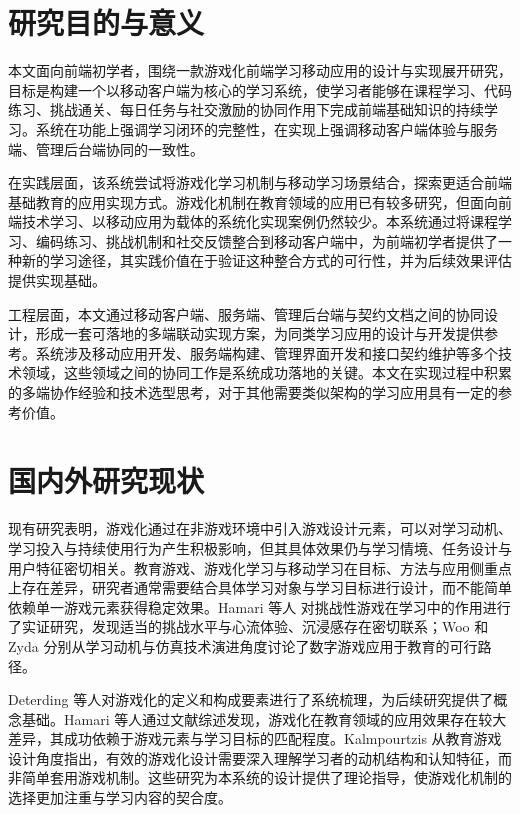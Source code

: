 \section{研究目的与意义}

本文面向前端初学者，围绕一款游戏化前端学习移动应用的设计与实现展开研究，目标是构建一个以移动客户端为核心的学习系统，使学习者能够在课程学习、代码练习、挑战通关、每日任务与社交激励的协同作用下完成前端基础知识的持续学习。系统在功能上强调学习闭环的完整性，在实现上强调移动客户端体验与服务端、管理后台端协同的一致性。

在实践层面，该系统尝试将游戏化学习机制与移动学习场景结合，探索更适合前端基础教育的应用实现方式。游戏化机制在教育领域的应用已有较多研究，但面向前端技术学习、以移动应用为载体的系统化实现案例仍然较少。本系统通过将课程学习、编码练习、挑战机制和社交反馈整合到移动客户端中，为前端初学者提供了一种新的学习途径，其实践价值在于验证这种整合方式的可行性，并为后续效果评估提供实现基础。

工程层面，本文通过移动客户端、服务端、管理后台端与契约文档之间的协同设计，形成一套可落地的多端联动实现方案，为同类学习应用的设计与开发提供参考\cite{sommerville2015,sylvester2013,kalmpourtzis2018}。系统涉及移动应用开发、服务端构建、管理界面开发和接口契约维护等多个技术领域，这些领域之间的协同工作是系统成功落地的关键。本文在实现过程中积累的多端协作经验和技术选型思考，对于其他需要类似架构的学习应用具有一定的参考价值。

\section{国内外研究现状}

现有研究表明，游戏化通过在非游戏环境中引入游戏设计元素，可以对学习动机、学习投入与持续使用行为产生积极影响，但其具体效果仍与学习情境、任务设计与用户特征密切相关。教育游戏、游戏化学习与移动学习在目标、方法与应用侧重点上存在差异，研究者通常需要结合具体学习对象与学习目标进行设计，而不能简单依赖单一游戏元素获得稳定效果。Hamari 等人\cite{hamari2016} 对挑战性游戏在学习中的作用进行了实证研究，发现适当的挑战水平与心流体验、沉浸感存在密切联系；Woo\cite{woo2014} 和 Zyda\cite{zyda2005} 分别从学习动机与仿真技术演进角度讨论了数字游戏应用于教育的可行路径\cite{deterding2011,hamari2014,kalmpourtzis2018}。

Deterding 等人对游戏化的定义和构成要素进行了系统梳理，为后续研究提供了概念基础。Hamari 等人通过文献综述发现，游戏化在教育领域的应用效果存在较大差异，其成功依赖于游戏元素与学习目标的匹配程度。Kalmpourtzis 从教育游戏设计角度指出，有效的游戏化设计需要深入理解学习者的动机结构和认知特征，而非简单套用游戏机制。这些研究为本系统的设计提供了理论指导，使游戏化机制的选择更加注重与学习内容的契合度。

